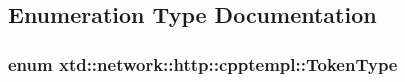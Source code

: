\subsection{Enumeration Type Documentation}
\hypertarget{namespacextd_1_1network_1_1http_1_1cpptempl_a39833083d228a5b5ef9f6bb7896479ee}{
\subsubsection[{Token\-Type}]{\setlength{\rightskip}{0pt plus 5cm}enum {\bf xtd\-::network\-::http\-::cpptempl\-::\-Token\-Type}}}\label{namespacextd_1_1network_1_1http_1_1cpptempl_a39833083d228a5b5ef9f6bb7896479ee}
